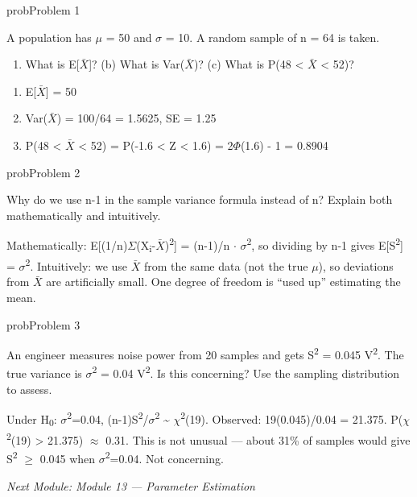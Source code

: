 \begin{PSbox}[unbreakable]{prob}{Problem 1}

A population has \ensuremath{\mu} = 50 and \ensuremath{\sigma} = 10. A random sample of n = 64 is taken.

\begin{enumerate}
\def\labelenumi{(\alph{enumi})}
\tightlist
\item
  What is E[\ensuremath{\bar{X}}]? (b) What is Var(\ensuremath{\bar{X}})? (c) What is P(48 \textless{} \ensuremath{\bar{X}} \textless{} 52)?
\end{enumerate}

\PSsolution{} 

\begin{enumerate}
\def\labelenumi{(\alph{enumi})}
\tightlist
\item
  E[\ensuremath{\bar{X}}] = 50
\item
  Var(\ensuremath{\bar{X}}) = 100/64 = 1.5625, SE = 1.25
\item
  P(48 \textless{} \ensuremath{\bar{X}} \textless{} 52) = P(-1.6 \textless{} Z \textless{} 1.6) = 2\ensuremath{\Phi}(1.6) - 1 = 0.8904
\end{enumerate}

\end{PSbox}

\begin{PSbox}[unbreakable]{prob}{Problem 2}

Why do we use n-1 in the sample variance formula instead of n? Explain both mathematically and intuitively.

\PSsolution{} Mathematically: E[(1/n)\ensuremath{\Sigma}(X\textsubscript{i}-\ensuremath{\bar{X}})\textsuperscript{2}] = (n-1)/n \ensuremath{\cdot} \ensuremath{\sigma}\textsuperscript{2}, so dividing by n-1 gives E[S\textsuperscript{2}] = \ensuremath{\sigma}\textsuperscript{2}. Intuitively: we use \ensuremath{\bar{X}} from the same data (not the true \ensuremath{\mu}), so deviations from \ensuremath{\bar{X}} are artificially small. One degree of freedom is ``used up'' estimating the mean.

\end{PSbox}

\begin{PSbox}[unbreakable]{prob}{Problem 3}

An engineer measures noise power from 20 samples and gets S\textsuperscript{2} = 0.045 V\textsuperscript{2}. The true variance is \ensuremath{\sigma}\textsuperscript{2} = 0.04 V\textsuperscript{2}. Is this concerning? Use the sampling distribution to assess.

\PSsolution{} Under H\textsubscript{0}: \ensuremath{\sigma}\textsuperscript{2}=0.04, (n-1)S\textsuperscript{2}/\ensuremath{\sigma}\textsuperscript{2} \textasciitilde{} \ensuremath{\chi}\textsuperscript{2}(19). Observed: 19(0.045)/0.04 = 21.375. P(\ensuremath{\chi}\textsuperscript{2}(19) \textgreater{} 21.375) \ensuremath{\approx} 0.31. This is not unusual — about 31\% of samples would give S\textsuperscript{2} \ensuremath{\ge} 0.045 when \ensuremath{\sigma}\textsuperscript{2}=0.04. Not concerning.

\emph{Next Module: {Module 13 — Parameter Estimation}}

\end{PSbox}

